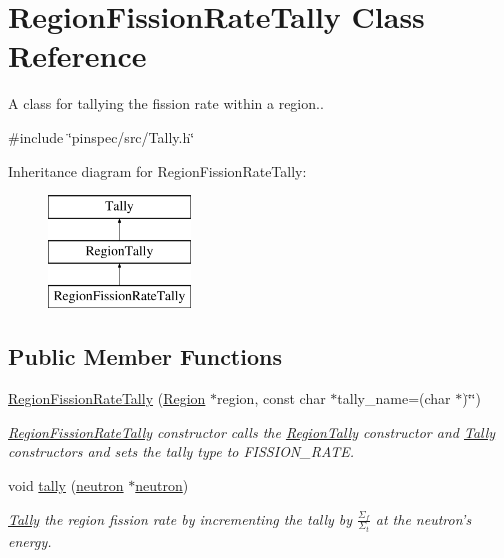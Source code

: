 \hypertarget{classRegionFissionRateTally}{\section{Region\-Fission\-Rate\-Tally Class Reference}
\label{classRegionFissionRateTally}
}


A class for tallying the fission rate within a region..  




{\ttfamily \#include \char`\"{}pinspec/src/\-Tally.\-h\char`\"{}}

Inheritance diagram for Region\-Fission\-Rate\-Tally\-:\begin{figure}[H]
\begin{center}
\leavevmode
\includegraphics[height=3.000000cm]{classRegionFissionRateTally}
\end{center}
\end{figure}
\subsection*{Public Member Functions}
\begin{DoxyCompactItemize}
\item 
\hyperlink{classRegionFissionRateTally_af3344001e9ba2ac13119191e49111d3d}{Region\-Fission\-Rate\-Tally} (\hyperlink{classRegion}{Region} $\ast$region, const char $\ast$tally\-\_\-name=(char $\ast$)\char`\"{}\char`\"{})
\begin{DoxyCompactList}\small\item\em \hyperlink{classRegionFissionRateTally}{Region\-Fission\-Rate\-Tally} constructor calls the \hyperlink{classRegionTally}{Region\-Tally} constructor and \hyperlink{classTally}{Tally} constructors and sets the tally type to F\-I\-S\-S\-I\-O\-N\-\_\-\-R\-A\-T\-E. \end{DoxyCompactList}\item 
void \hyperlink{classRegionFissionRateTally_a1d6e8da254f83a462de8ccf5226f1fee}{tally} (\hyperlink{structneutron}{neutron} $\ast$\hyperlink{structneutron}{neutron})
\begin{DoxyCompactList}\small\item\em \hyperlink{classTally}{Tally} the region fission rate by incrementing the tally by $ \frac{\Sigma_f}{\Sigma_t} $ at the neutron's energy. \end{DoxyCompactList}\end{DoxyCompactItemize}
